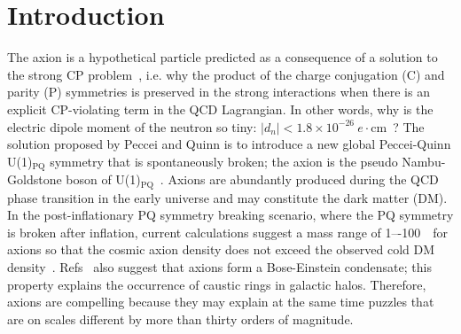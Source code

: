 \section{Introduction} \label{sec:intro}
The axion is a hypothetical particle predicted as a consequence of a  
solution to the strong CP problem~\cite{strongCPI,strongCPII,strongCPIII}, 
i.e. why the product of the charge 
conjugation (C) and parity (P) symmetries is preserved in the strong 
interactions when there is an explicit CP-violating term in the QCD 
Lagrangian. In other words, why is the electric dipole moment 
of the neutron so tiny:  
$\left|d_n\right| < 1.8 \times10^{-26}~e\cdot\mathrm{cm}$~\cite{EDM,PDG}? 
The solution proposed by Peccei and Quinn is to introduce a new global 
Peccei-Quinn U(1)$_\mathrm{PQ}$ symmetry that is spontaneously broken; the 
axion is the pseudo Nambu-Goldstone boson of 
U(1)$_\mathrm{PQ}$~\cite{strongCPI}. 
Axions are abundantly produced during the QCD phase transition in 
the early universe and may constitute the dark matter (DM). 
In the post-inflationary PQ symmetry breaking scenario, where the PQ symmetry
is broken after inflation, current calculations suggest a mass range of 
1–-100~\muevcc\ for axions so that the cosmic axion density does not exceed 
the 
observed cold DM density~\cite{QCDCalI,QCDCalII,QCDCalIII,QCDCalIV,QCDCalV,QCDCalVI,QCDCalVII,QCDCalVIII,QCDCalIX,QCDCalX,QCDCalXI,QCDCalXII,QCDCalXIII}. 
Refs~\cite{axionDMI,axionDMII,axionDMIII} also suggest that axions form a 
Bose-Einstein condensate; this property explains the occurrence of 
caustic rings in galactic halos. Therefore, axions are compelling because 
they may explain at the same 
time puzzles that are on scales different by more than thirty orders of 
magnitude. 


%
%
%

%
%
%

